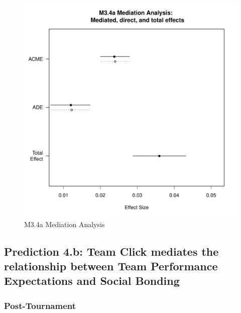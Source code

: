            \begin{figure}[htbp]
             \includegraphics[scale=.5]{images/MLM34aMediationAnalysis.pdf}
             \caption{M3.4a Mediation Analysis}
             \label{fig:MLM34aMediationAnalysis}
           \end{figure}







       \subsection{Prediction 4.b: Team Click mediates the relationship between Team Performance Expectations and Social Bonding}

            \subsubsection{Post-Tournament}


